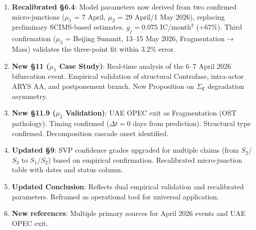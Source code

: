 \documentclass[12pt,a4paper]{article}
\newcommand{\gj}{g_j}
\newcommand{\SigmaCF}{\Sigma_{\mathfrak{C}}}  %
\begin{document}
\begin{enumerate}[label=\textbf{\arabic*.},resume]
    \item \textbf{Recalibrated §6.4}: Model parameters now derived from two confirmed micro-junctions ($\mu_1$ = 7 April, $\mu_2$ = 29 April/1 May 2026), replacing preliminary SCIMS-based estimates. $\gj = 0.075$ IC/month$^2$ ($+67\%$). Third confirmation ($\mu_3$ = Beijing Summit, 13--15 May 2026, Fragmentation$\to$Mass) validates the three-point fit within 3.2\% error.
    \item \textbf{New §11 ($\mu_1$ Case Study)}: Real-time analysis of the 6--7 April 2026 bifurcation event. Empirical validation of structural Controfase, intra-actor ARYS AA, and postponement branch. New Proposition on $\SigmaCF$ degradation asymmetry.
    \item \textbf{New §11.9 ($\mu_2$ Validation)}: UAE OPEC exit as Fragmentation (OST pathology). Timing confirmed ($\Delta t = 0$ days from prediction). Structural type confirmed. Decomposition cascade onset identified.
    \item \textbf{Updated §9}: SVP confidence grades upgraded for multiple claims (from $S_2$/$S_3$ to $S_1$/$S_2$) based on empirical confirmation. Recalibrated micro-junction table with dates and status column.
    \item \textbf{Updated Conclusion}: Reflects dual empirical validation and recalibrated parameters. Reframed as operational tool for universal application.
    \item \textbf{New references}: Multiple primary sources for April 2026 events and UAE OPEC exit.
\end{enumerate}


\end{document}
